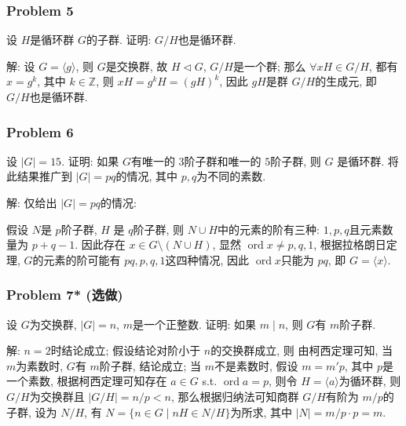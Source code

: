\documentclass[a4paper,12pt]{ctexart}
\newcommand{\Z}{\mathbb{Z}}
\begin{document}
\subsubsection*{Problem 5}
  设 $ H $是循环群 $ G $的子群. 证明: $ G/H $也是循环群.

  解: 设 $ G=\langle g\rangle $, 则 $ G $是交换群, 故 $ H\triangleleft G $, $ G/H $是一个群; 
  那么 $ \forall xH\in G/H $, 都有 $ x=g^k $, 其中 $ k\in\Z $, 则 $ xH=g^kH=(gH)^k $, 因此 $ gH $是群 $ G/H $的生成元, 
  即 $ G/H $也是循环群.

\subsubsection*{Problem 6}
  设 $ |G|=15 $. 证明: 如果 $ G $有唯一的 $ 3 $阶子群和唯一的 $ 5 $阶子群, 则 $ G $ 是循环群. 
  将此结果推广到 $ |G|=pq $的情况, 其中  $ p,q $为不同的素数.
  
  解: 仅给出  $ |G|=pq  $的情况: 

  假设 $ N $是 $ p $阶子群, $ H $ 是 $ q $阶子群, 则 $ N\cup H $中的元素的阶有三种: $ 1,p,q $且元素数量为 $ p+q-1 $. 
  因此存在 $ x\in G\setminus(N\cup H) $, 显然 $ \operatorname{ord}x\ne p,q,1 $, 根据拉格朗日定理,  $ G $的元素的阶可能有 
  $ pq,p,q,1 $这四种情况, 因此 $ \operatorname{ord}x $只能为 $ pq $, 即 $ G=\langle x\rangle $.

\subsubsection*{Problem 7* (选做)}
  设 $ G $为交换群, $ |G|=n $, $ m $是一个正整数. 证明: 如果 $ m\mid n $, 则 $ G $有 $ m $阶子群.

  解: $ n=2 $时结论成立; 
  假设结论对阶小于 $ n $的交换群成立, 则
  由柯西定理可知, 当 $ m $为素数时, $ G $有 $ m $阶子群, 结论成立;
  当 $ m $不是素数时, 假设 $ m=m'p $, 其中 $ p $是一个素数, 根据柯西定理可知存在 $ a\in G $ s.t. $ \operatorname{ord} a=p $, 
  则令 $ H=\langle a\rangle $为循环群, 则 $ G/H $为交换群且 $ |G/H|=n/p<n $, 
  那么根据归纳法可知商群 $ G/H $有阶为 $ m/p $的子群, 设为 $ N/H $, 有 $ N=\{n\in G\mid nH\in N/H\} $为所求, 其中 $ |N|=m/p\cdot p=m $.
\end{document}

